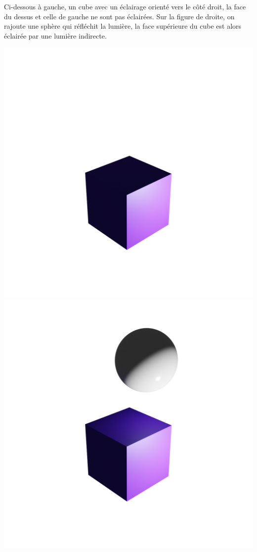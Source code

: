 \documentclass[11pt,class=report,crop=false]{standalone}
\begin{document}
Ci-dessous à gauche, un cube avec un éclairage orienté vers le côté droit, la face du dessus et celle de gauche ne sont pas éclairées.
Sur la figure de droite, on rajoute une sphère qui réfléchit la lumière, la face supérieure du cube est alors éclairée par une lumière indirecte.
\begin{center}
	\includegraphics[scale=\myscale,scale=0.25,trim={4cm 2cm 4cm 2cm},clip]{figures/ray-tracing-01-1}
	\qquad
	\includegraphics[scale=\myscale,scale=0.25,trim={4cm 2cm 4cm 2cm},clip]{figures/ray-tracing-01-2}
\end{center}	
\end{document}
